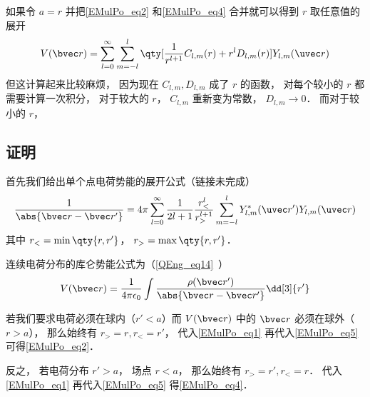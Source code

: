 如果令 $a = r$ 并把\autoref{EMulPo_eq2} 和\autoref{EMulPo_eq4} 合并就可以得到 $r$ 取任意值的展开
\begin{equation}
V(\bvec r) = \sum_{l = 0}^\infty\sum_{m = -l}^l \qty[\frac{1}{r^{l+1}} C_{l,m}(r) + r^l D_{l,m}(r)] Y_{l,m}(\uvec r)
\end{equation}
但这计算起来比较麻烦， 因为现在 $C_{l,m}, D_{l,m}$ 成了 $r$ 的函数， 对每个较小的 $r$ 都需要计算一次积分， 对于较大的 $r$， $C_{l,m}$ 重新变为常数， $D_{l,m}\to 0$． 而对于较小的 $r$， 

\subsection{证明}
首先我们给出单个点电荷势能的展开公式（链接未完成）
\begin{equation}\label{EMulPo_eq1}
\frac{1}{\abs{\bvec r - \bvec r'}} = 4\pi \sum_{l=0}^{\infty} \frac{1}{2l+1} \frac{r_<^l}{r_>^{l+1}} \sum_{m = -l}^l Y_{l,m}^*(\uvec r') Y_{l,m}(\uvec r)
\end{equation}
其中 $r_< = \min\qty{r, r'}$， $r_> = \max\qty{r, r'}$．

连续电荷分布的库仑势能公式为（\autoref{QEng_eq14}~）
\begin{equation}\label{EMulPo_eq5}
V(\bvec r) = \frac{1}{4\pi\epsilon_0}\int \frac{\rho(\bvec r')}{\abs{\bvec r - \bvec r'}} \dd[3]{r'}
\end{equation}

若我们要求电荷必须在球内（$r' < a$）而 $V(\bvec r)$ 中的 $\bvec r$ 必须在球外（$r > a$）， 那么始终有 $r_> = r, r_< = r'$， 代入\autoref{EMulPo_eq1} 再代入\autoref{EMulPo_eq5} 可得\autoref{EMulPo_eq2}．

反之， 若电荷分布 $r' > a$， 场点 $r < a$， 那么始终有 $r_> = r', r_< = r$． 代入\autoref{EMulPo_eq1} 再代入\autoref{EMulPo_eq5} 得\autoref{EMulPo_eq4}．
